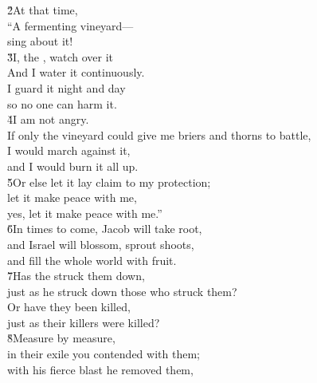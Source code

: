 \begin{poetry}
\poeml \v{2}At that time, \\
\poemll    ``A fermenting vineyard--- \\
\poemlll       sing about it! \\
\poeml \v{3}I, the , watch over it \\
\poemll    And I water it continuously. \\
\poeml I guard it night and day \\
\poemll    so no one can harm it. \\
\poeml \v{4}I am not angry. \\
\poemll    If only the vineyard could give me briers and thorns to battle, \\
\poeml I would march against it, \\
\poemll    and I would burn it all up. \\
\poeml \v{5}Or else let it lay claim to my protection; \\
\poemll    let it make peace with me, \\
\poemlll       yes, let it make peace with me.'' \\
\poeml \v{6}In times to come, Jacob will take root, \\
\poemll    and Israel will blossom, sprout shoots, \\
\poemlll       and fill the whole world with fruit. \\
\poeml \v{7}Has the  struck them down, \\
\poemll    just as he struck down those who struck them? \\
\poeml Or have they been killed, \\
\poemll    just as their killers were killed? \\
\poeml \v{8}Measure by measure, \\
\poemll    in their exile you contended with them; \\
\poeml with his fierce blast he removed them, \\

\end{poetry}
